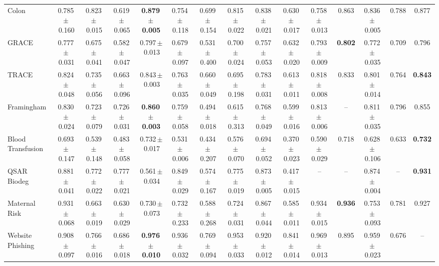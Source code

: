 \documentclass[8pt]{extarticle}
\begin{document}
\begin{longtable}{l*{14}{c}}
Colon & 0.785\,$\pm$\,0.160 & 0.823\,$\pm$\,0.015 & 0.619\,$\pm$\,0.065 & \textbf{0.879\,$\pm$\,0.005} & 0.754\,$\pm$\,0.118 & 0.699\,$\pm$\,0.154 & 0.815\,$\pm$\,0.022 & 0.838\,$\pm$\,0.021 & 0.630\,$\pm$\,0.017 & 0.758\,$\pm$\,0.013 & 0.863 & 0.836\,$\pm$\,0.005 & 0.788 & 0.877 \\
GRACE & 0.777\,$\pm$\,0.031 & 0.675\,$\pm$\,0.041 & 0.582\,$\pm$\,0.047 & 0.797\,$\pm$\,0.013 & 0.679\,$\pm$\,0.097 & 0.531\,$\pm$\,0.400 & 0.700\,$\pm$\,0.024 & 0.757\,$\pm$\,0.053 & 0.632\,$\pm$\,0.020 & 0.793\,$\pm$\,0.009 & \textbf{0.802} & 0.772\,$\pm$\,0.035 & 0.709 & 0.796 \\
TRACE & 0.824\,$\pm$\,0.048 & 0.735\,$\pm$\,0.056 & 0.663\,$\pm$\,0.096 & 0.843\,$\pm$\,0.003 & 0.763\,$\pm$\,0.035 & 0.660\,$\pm$\,0.049 & 0.695\,$\pm$\,0.198 & 0.783\,$\pm$\,0.031 & 0.613\,$\pm$\,0.011 & 0.818\,$\pm$\,0.008 & 0.833 & 0.801\,$\pm$\,0.014 & 0.764 & \textbf{0.843} \\
Framingham & 0.830\,$\pm$\,0.024 & 0.723\,$\pm$\,0.079 & 0.726\,$\pm$\,0.031 & \textbf{0.860\,$\pm$\,0.003} & 0.759\,$\pm$\,0.058 & 0.494\,$\pm$\,0.018 & 0.615\,$\pm$\,0.313 & 0.768\,$\pm$\,0.049 & 0.599\,$\pm$\,0.016 & 0.813\,$\pm$\,0.006 & -- & 0.811\,$\pm$\,0.035 & 0.796 & 0.855 \\
Blood Transfusion & 0.693\,$\pm$\,0.147 & 0.539\,$\pm$\,0.148 & 0.483\,$\pm$\,0.058 & 0.732\,$\pm$\,0.017 & 0.531\,$\pm$\,0.006 & 0.434\,$\pm$\,0.207 & 0.576\,$\pm$\,0.070 & 0.694\,$\pm$\,0.052 & 0.370\,$\pm$\,0.023 & 0.590\,$\pm$\,0.029 & 0.718 & 0.628\,$\pm$\,0.106 & 0.633 & \textbf{0.732} \\
QSAR Biodeg & 0.881\,$\pm$\,0.041 & 0.772\,$\pm$\,0.022 & 0.777\,$\pm$\,0.021 & 0.561\,$\pm$\,0.034 & 0.849\,$\pm$\,0.029 & 0.574\,$\pm$\,0.167 & 0.775\,$\pm$\,0.019 & 0.873\,$\pm$\,0.005 & 0.417\,$\pm$\,0.015 & -- & -- & 0.874\,$\pm$\,0.004 & -- & \textbf{0.931} \\
Maternal Risk & 0.931\,$\pm$\,0.068 & 0.663\,$\pm$\,0.019 & 0.630\,$\pm$\,0.029 & 0.730\,$\pm$\,0.073 & 0.732\,$\pm$\,0.233 & 0.588\,$\pm$\,0.268 & 0.724\,$\pm$\,0.031 & 0.867\,$\pm$\,0.044 & 0.585\,$\pm$\,0.011 & 0.934\,$\pm$\,0.015 & \textbf{0.936} & 0.753\,$\pm$\,0.093 & 0.781 & 0.927 \\
Website Phishing & 0.908\,$\pm$\,0.097 & 0.766\,$\pm$\,0.016 & 0.686\,$\pm$\,0.018 & \textbf{0.976\,$\pm$\,0.010} & 0.936\,$\pm$\,0.032 & 0.769\,$\pm$\,0.094 & 0.953\,$\pm$\,0.033 & 0.920\,$\pm$\,0.012 & 0.841\,$\pm$\,0.014 & 0.969\,$\pm$\,0.013 & 0.895 & 0.959\,$\pm$\,0.023 & 0.676 & -- \\
\end{longtable}
\end{document}
